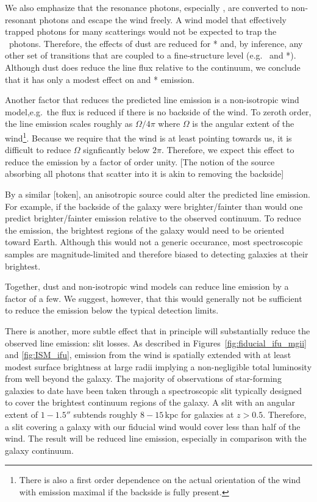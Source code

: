 \documentclass[12pt,preprint]{aastex}
\begin{document}
We also emphasize that the  resonance photons, especially
\feiia, are converted to non-resonant photons and escape the wind
freely.  A wind model that effectively trapped 
photons for many scatterings would not be expected to trap the
\feiid\ photons.  Therefore, the effects of dust are 
reduced for * and, by inference, any other set of
transitions that are coupled to a fine-structure level (e.g.\
 and *).  
Although dust does reduce the line flux relative to the continuum, we
conclude that it has only a modest effect on \ion{Mg}{2} and
* emission.    

Another factor that reduces the predicted line emission is a
non-isotropic wind model,e.g.\ the flux is reduced if there is no
backside of the wind.  To zeroth order, the line emission scales
roughly as $\Omega/4\pi$ where $\Omega$ is the angular extent of the
wind\footnote{There is also a first order dependence on the actual
  orientation of the wind with emission maximal if the backside is
  fully present.}.  Because we require that the wind is at least
pointing towards us, it is difficult to reduce $\Omega$ signficantly
below $2 \pi$.  Therefore, we expect this effect to reduce the
emission by a factor of order unity.  
[The notion of the source absorbing all photons that scatter into it
is akin to removing the backside]

By a similar [token], an anisotropic source could alter the predicted
line emission.  For example, if the backside of the galaxy were
brighter/fainter than would one predict brighter/fainter emission
relative to the observed continuum.
To reduce the emission, the brightest regions
of the galaxy would need to be oriented toward Earth.  Although this would not a
generic occurance, most spectroscopic samples are magnitude-limited
and therefore biased to detecting galaxies at their brightest.

Together, dust and non-isotropic wind models can reduce line emission
by a factor of a few.  We suggest, however, that this would generally
not be sufficient to reduce the emission below the typical detection
limits. 

There is another, more subtle effect that in principle will
substantially reduce the observed line emission: slit losses.  As
described in Figures~\ref{fig:fiducial_ifu_mgii} and
\ref{fig:ISM_ifu}, emission from the wind is spatially extended with
at least modest surface brightness at large radii implying a
non-negligible total luminosity from well beyond the galaxy.  
The majority of observations of star-forming galaxies to date have
been taken through a spectroscopic slit typically designed to cover
the brightest continuum regions of the galaxy.  A slit with an angular
extent of $1-1.5''$ subtends roughly $8-15$\,kpc for galaxies at $z>0.5$.
Therefore, a slit covering a galaxy with our fiducial wind would cover
less than half of the wind.  The result will be reduced line emission,
especially in comparison with the galaxy continuum.
\end{document}
